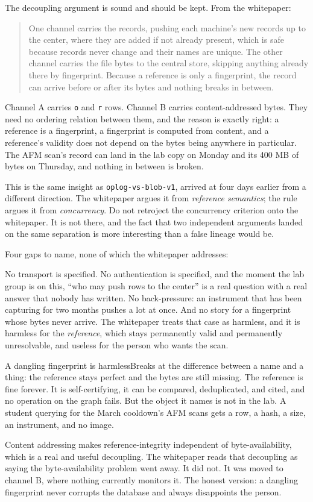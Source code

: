 The decoupling argument is sound and should be kept. From the whitepaper:

\begin{quote}
One channel carries the records, pushing each machine's new records up to the center, where they are added if not already present, which is safe because records never change and their names are unique. The other channel carries the file bytes to the central store, skipping anything already there by fingerprint. Because a reference is only a fingerprint, the record can arrive before or after its bytes and nothing breaks in between.
\end{quote}

Channel A carries \texttt{o} and \texttt{r} rows. Channel B carries content-addressed bytes. They need no ordering relation between them, and the reason is exactly right: a reference is a fingerprint, a fingerprint is computed from content, and a reference's validity does not depend on the bytes being anywhere in particular. The AFM scan's record can land in the lab copy on Monday and its 400 MB of bytes on Thursday, and nothing in between is broken.

This is the same insight as \texttt{oplog-vs-blob-v1}, arrived at four days earlier from a different direction. The whitepaper argues it from \emph{reference semantics}; the rule argues it from \emph{concurrency}. Do not retroject the concurrency criterion onto the whitepaper. It is not there, and the fact that two independent arguments landed on the same separation is more interesting than a false lineage would be.

Four gaps to name, none of which the whitepaper addresses:

No transport is specified. No authentication is specified, and the moment the lab group is on this, ``who may push rows to the center'' is a real question with a real answer that nobody has written. No back-pressure: an instrument that has been capturing for two months pushes a lot at once. And no story for a fingerprint whose bytes never arrive. The whitepaper treats that case as harmless, and it is harmless for the \emph{reference}, which stays permanently valid and permanently unresolvable, and useless for the person who wants the scan.

\begin{Analogy}{A dangling fingerprint is harmless}{Breaks at the difference between a name and a thing: the reference stays perfect and the bytes are still missing.}
The reference is fine forever. It is self-certifying, it can be compared, deduplicated, and cited, and no operation on the graph fails. But the object it names is not in the lab. A student querying for the March cooldown's AFM scans gets a row, a hash, a size, an instrument, and no image.

Content addressing makes reference-integrity independent of byte-availability, which is a real and useful decoupling. The whitepaper reads that decoupling as saying the byte-availability problem went away. It did not. It was moved to channel B, where nothing currently monitors it. The honest version: a dangling fingerprint never corrupts the database and always disappoints the person.
\end{Analogy}

